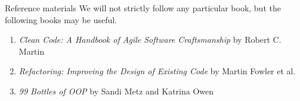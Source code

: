 \begin{frame}{Reference materials}
We will not strictly follow any particular book, but the following books may be useful.

  \begin{enumerate}
    \item \textit{Clean Code: A Handbook of Agile Software Craftsmanship} by Robert C. Martin
    \item \textit{Refactoring: Improving the Design of Existing Code} by Martin Fowler et al.
    \item \textit{99 Bottles of OOP} by Sandi Metz and Katrina Owen
  \end{enumerate}

\end{frame}